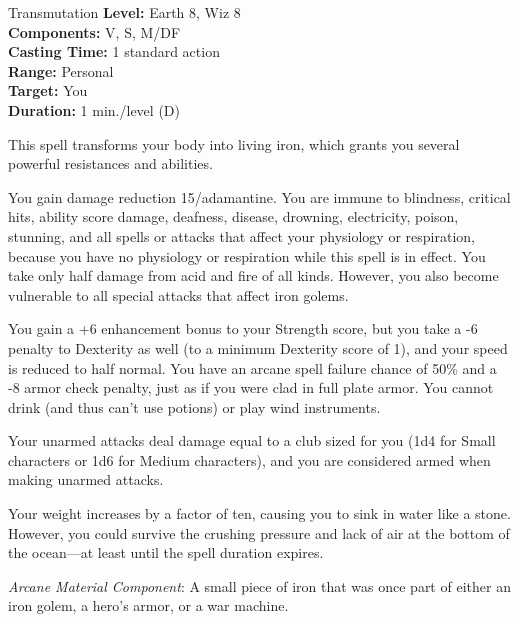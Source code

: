 {Transmutation}
{
	\textbf{Level:}
	Earth 8, Wiz 8\\
	\textbf{Components:}
	V, S, M/DF\\
	\textbf{Casting Time:}
	1 standard action\\
	\textbf{Range:}
	Personal\\
	\textbf{Target:}
	You\\
	\textbf{Duration:}
	1 min./level (D)\\
}
{
	This spell transforms your body into living iron, which grants you several powerful resistances and abilities.

	You gain damage reduction 15/adamantine. You are immune to blindness, critical hits, ability score damage, deafness, disease, drowning, electricity, poison, stunning, and all spells or attacks that affect your physiology or respiration, because you have no physiology or respiration while this spell is in effect. You take only half damage from acid and fire of all kinds. However, you also become vulnerable to all special attacks that affect iron golems.

	You gain a +6 enhancement bonus to your Strength score, but you take a -6 penalty to Dexterity as well (to a minimum Dexterity score of 1), and your speed is reduced to half normal. You have an arcane spell failure chance of 50\% and a -8 armor check penalty, just as if you were clad in full plate armor. You cannot drink (and thus can't use potions) or play wind instruments.

	Your unarmed attacks deal damage equal to a club sized for you (1d4 for Small characters or 1d6 for Medium characters), and you are considered armed when making unarmed attacks.

	Your weight increases by a factor of ten, causing you to sink in water like a stone. However, you could survive the crushing pressure and lack of air at the bottom of the ocean---at least until the spell duration expires.

	\textit{Arcane Material Component}:
	A small piece of iron that was once part of either an iron golem, a hero's armor, or a war machine.

}
